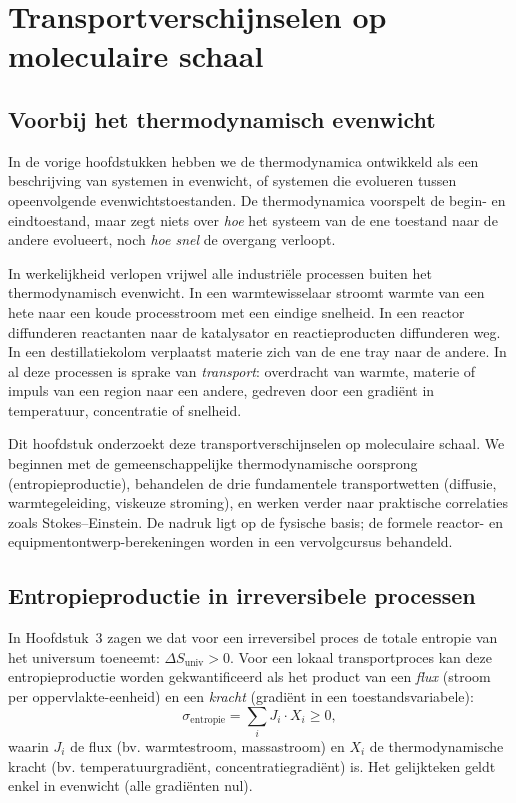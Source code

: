 \chapter{Transportverschijnselen op moleculaire schaal}
\label{ch:transport}

\section{Voorbij het thermodynamisch evenwicht}

In de vorige hoofdstukken hebben we de thermodynamica ontwikkeld als een beschrijving van systemen in evenwicht, of systemen die evolueren tussen opeenvolgende evenwichtstoestanden. De thermodynamica voorspelt de begin- en eindtoestand, maar zegt niets over \emph{hoe} het systeem van de ene toestand naar de andere evolueert, noch \emph{hoe snel} de overgang verloopt.

In werkelijkheid verlopen vrijwel alle industri\"ele processen buiten het thermodynamisch evenwicht. In een warmtewisselaar stroomt warmte van een hete naar een koude processtroom met een eindige snelheid. In een reactor diffunderen reactanten naar de katalysator en reactieproducten diffunderen weg. In een destillatiekolom verplaatst materie zich van de ene tray naar de andere. In al deze processen is sprake van \emph{transport}: overdracht van warmte, materie of impuls van een region naar een andere, gedreven door een gradi\"ent in temperatuur, concentratie of snelheid.

Dit hoofdstuk onderzoekt deze transportverschijnselen op moleculaire schaal. We beginnen met de gemeenschappelijke thermodynamische oorsprong (entropieproductie), behandelen de drie fundamentele transportwetten (diffusie, warmtegeleiding, viskeuze stroming), en werken verder naar praktische correlaties zoals Stokes--Einstein. De nadruk ligt op de fysische basis; de formele reactor- en equipmentontwerp-berekeningen worden in een vervolgcursus behandeld.

\section{Entropieproductie in irreversibele processen}

In Hoofdstuk~3 zagen we dat voor een irreversibel proces de totale entropie van het universum toeneemt: $\Delta S_{\text{univ}} > 0$. Voor een lokaal transportproces kan deze entropieproductie worden gekwantificeerd als het product van een \emph{flux} (stroom per oppervlakte-eenheid) en een \emph{kracht} (gradi\"ent in een toestandsvariabele):
\begin{equation}
\sigma_{\text{entropie}} = \sum_i J_i \cdot X_i \geq 0,
\end{equation}
waarin $J_i$ de flux (bv. warmtestroom, massastroom) en $X_i$ de thermodynamische kracht (bv. temperatuurgradi\"ent, concentratiegradi\"ent) is. Het gelijkteken geldt enkel in evenwicht (alle gradi\"enten nul).

